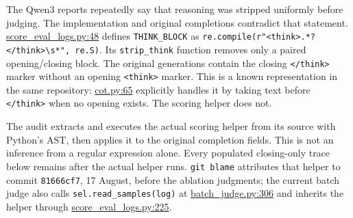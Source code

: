 \documentclass[
  british,
  10pt,
  a4paper,
]{article}
\begin{document}
The Qwen3 reports repeatedly say that reasoning was stripped uniformly
before judging. The implementation and original completions contradict
that statement.
\href{../../../../em-and-optimisers/scripts/score_eval_logs.py\#L48}{score\_\allowbreak{}eval\_\allowbreak{}logs.\allowbreak{}py:\allowbreak{}48}
defines \texttt{THINK\_\allowbreak{}BLOCK} as
\texttt{re.\allowbreak{}compile(r"<t\allowbreak{}hink>.\allowbreak{}*?</\allowbreak{}think>\textbackslash{}s*",\allowbreak{} \allowbreak{}re.\allowbreak{}S)}.
Its \texttt{strip\_\allowbreak{}think} function removes only a paired
opening/\allowbreak{}closing block. The original generations contain the
closing \texttt{\textless{}/think\textgreater{}} marker without an
opening \texttt{\textless{}think\textgreater{}} marker. This is a known
representation in the same repository:
\href{../../../../em-and-optimisers/src/analysis/cot.py\#L65}{cot.py:65}
explicitly handles it by taking text before
\texttt{\textless{}/think\textgreater{}} when no opening exists. The
scoring helper does not.

The audit extracts and executes the actual scoring helper from its
source with Python's AST, then applies it to the original completion
fields. This is not an inference from a regular expression alone. Every
populated closing-\allowbreak{}only trace below remains after the actual
helper runs. \texttt{git\ blame} attributes that helper to commit
\texttt{81666cf7}, 17 August, before the ablation judgments; the current
batch judge also calls
\texttt{sel.\allowbreak{}read\_\allowbreak{}samples(log)\allowbreak{}}
at
\href{../../../../em-and-optimisers/scripts/batch_judge.py\#L306}{batch\_\allowbreak{}judge.\allowbreak{}py:\allowbreak{}306}
and inherits the helper through
\href{../../../../em-and-optimisers/scripts/score_eval_logs.py\#L225}{score\_\allowbreak{}eval\_\allowbreak{}logs.\allowbreak{}py:\allowbreak{}225}.
\end{document}
